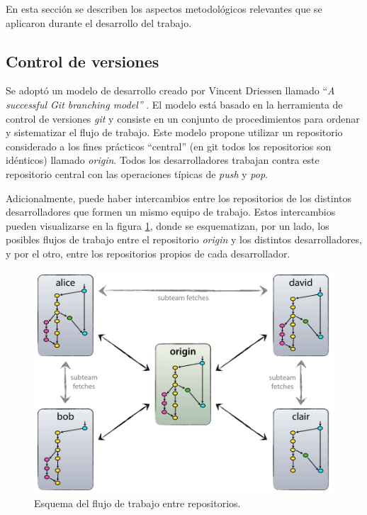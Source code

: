 En esta sección se describen los aspectos metodológicos relevantes que se aplicaron durante el desarrollo del trabajo.  

\subsection{Control de versiones}
\label{subsec:branching}

Se adoptó un modelo de desarrollo creado por Vincent Driessen llamado ``\textit{A successful Git branching model''} \citep{Driessen}.  El modelo está basado en la herramienta de control de versiones \textit{git} y consiste en un conjunto de procedimientos para ordenar y sistematizar el flujo de trabajo. Este modelo propone utilizar un repositorio considerado a los fines prácticos ``central'' (en git todos los repositorios son idénticos) llamado \textit{origin}.  Todos los desarrolladores trabajan contra este repositorio central con las operaciones típicas de \textit{push} y \textit{pop}.  

Adicionalmente, puede haber intercambios entre los repositorios de los distintos desarrolladores que formen un mismo equipo de trabajo. Estos intercambios pueden visualizarse en la figura \ref{fig:esquema-repos}, donde se esquematizan, por un lado, los posibles flujos de trabajo entre el repositorio \textit{origin} y los distintos desarrolladores, y por el otro, entre los repositorios propios de cada desarrollador. 

\begin{figure}[ht]
	\centering
	\includegraphics[width=.6\textwidth]{./Figures/centr-decentr@2x.png}
	\caption[Esquema del flujo de trabajo entre repositorios]{Esquema del flujo de trabajo entre repositorios\protect\footnotemark.}
	\label{fig:esquema-repos}
\end{figure}


